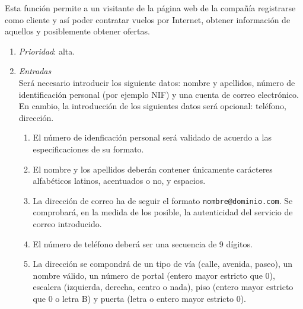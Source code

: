  \label{fun:registrarse}
	Esta función permite a un visitante de la página web de la compañía registrarse como cliente y así poder contratar vuelos por \gls{Internet}, obtener información de aquellos y posiblemente obtener ofertas.

	\begin{enumerate}
		\item \textit{Prioridad}: alta.
		\item \textit{Entradas}\\
			Será necesario introducir los siguiente datos: nombre y apellidos, número de identificación personal (por ejemplo \gls{NIF}) y una cuenta de correo electrónico. En cambio, la introducción de los siguientes datos será opcional: teléfono, dirección.

			\begin{enumerate}
				\item El número de idenficación personal será validado de acuerdo a las especificaciones de su formato.
				\item El nombre y los apellidos deberán contener únicamente carácteres alfabéticos latinos, acentuados o no, y espacios.
				\item La dirección de correo ha de seguir el formato \verb|nombre@dominio.com|. Se comprobará, en la medida de los posible, la autenticidad del servicio de correo introducido.
				\item El número de teléfono deberá ser una secuencia de 9 dígitos.
				\item La dirección se compondrá de un tipo de vía (calle, avenida, paseo), un nombre válido, un número de portal (entero mayor estricto que 0), escalera (izquierda, derecha, centro o nada), piso (entero mayor estricto que 0 o letra B) y puerta (letra o entero mayor estricto 0).
			\end{enumerate}
		

\end{enumerate}

